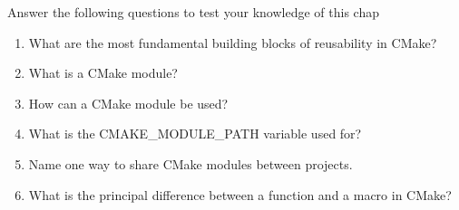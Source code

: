 Answer the following questions to test your knowledge of this chap

\begin{enumerate}
\item 
What are the most fundamental building blocks of reusability in CMake?

\item 
What is a CMake module?

\item 
How can a CMake module be used?

\item 
What is the CMAKE\_MODULE\_PATH variable used for?

\item 
Name one way to share CMake modules between projects.

\item 
What is the principal difference between a function and a macro in CMake?
\end{enumerate}